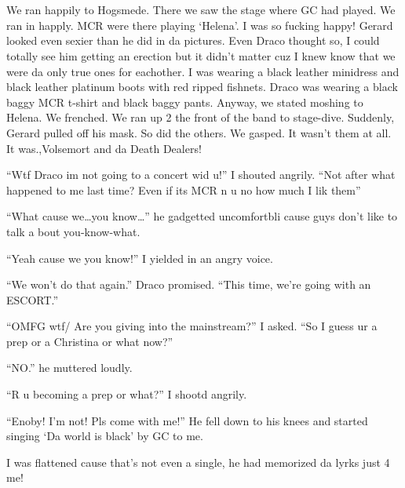 \section{}



We ran happily to Hogsmede. There we saw the stage where GC had played. We ran in happly. MCR were there playing \enquote*{Helena}. I was so fucking happy! Gerard looked even sexier than he did in da pictures. Even Draco thought so, I could totally see him getting an erection but it didn't matter cuz I knew know that we were da only true ones for eachother. I was wearing a black leather minidress and black leather platinum boots with red ripped fishnets. Draco was wearing a black baggy MCR t-shirt and black baggy pants. Anyway, we stated moshing to Helena. We frenched. We ran up 2 the front of the band to stage-dive. Suddenly, Gerard pulled off his mask. So did the others. We gasped. It wasn't them at all. It was.,\dotfill Volsemort and da Death Dealers!

\enquote{Wtf Draco im not going to a concert wid u!} I shouted angrily. \enquote{Not after what happened to me last time? Even if its MCR n u no how much I lik them}

\begin{sloppypar}
    \enquote{What cause we\ldots you know\ldots} he gadgetted uncom\-fort\-bli cause guys don't like to talk a bout you-know-what.
\end{sloppypar}

\enquote{Yeah cause we you know!} I yielded in an angry voice.

\enquote{We won't do that again.} Draco promised. \enquote{This time, we're going with an ESCORT\@.}

\enquote{OMFG wtf/ Are you giving into the mainstream?} I asked. \enquote{So I guess ur a prep or a Christina or what now?}

\enquote{NO\@.} he muttered loudly.

\enquote{R u becoming a prep or what?} I shootd angrily.

\enquote{Enoby! I'm not! Pls come with me!} He fell down to his knees and started singing \enquote*{Da world is black} by GC to me.

I was flattened cause that's not even a single, he had memorized da lyrks just 4 me!

